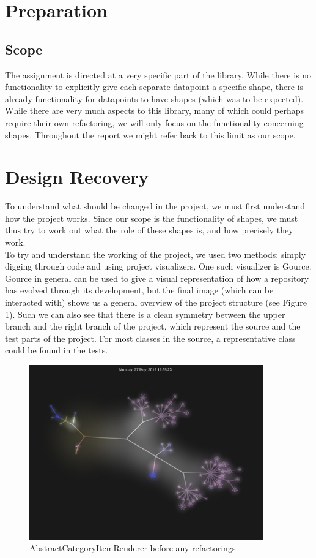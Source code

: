 \documentclass{article}
\begin{document}
\section{Preparation}

\subsection{Scope}

The assignment is directed at a very specific part of the library. While there is no functionality to explicitly give each separate datapoint a specific shape, there is already functionality for datapoints to have shapes (which was to be expected). While there are very much aspects to this library, many of which could perhaps require their own refactoring, we will only focus on the functionality concerning shapes. Throughout the report we might refer back to this limit as our scope.

\section{Design Recovery}

To understand what should be changed in the project, we must first understand how the project works. Since our scope is the functionality of shapes, we must thus try to work out what the role of these shapes is, and how precisely they work.\\

To try and understand the working of the project, we used two methods: simply digging through code and using project visualizers. One such visualizer is Gource. Gource in general can be used to give a visual representation of how a repository has evolved through its development, but the final image (which can be interacted with) shows us a general overview of the project structure (see Figure 1). Such we can also see that there is a clean symmetry between the upper branch and the right branch of the project, which represent the source and the test parts of the project. For most classes in the source, a representative class could be found in the tests.

\begin{figure}[H]
\centering
	\includegraphics[width=0.9\textwidth]{gource/GOURCE.png}
	\caption{AbstractCategoryItemRenderer before any refactorings}
\end{figure}
\end{document}
